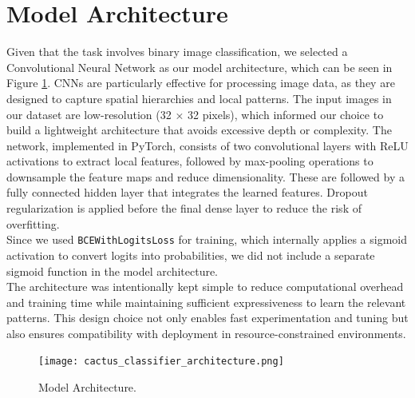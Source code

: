\documentclass[ngerman]{scrartcl}
\begin{document}
\section{Model Architecture}
Given that the task involves binary image classification, we selected a Convolutional Neural Network as our model architecture, which can be seen in Figure \ref{fig:model}. CNNs are particularly effective for processing image data, as they are designed to capture spatial hierarchies and local patterns. The input images in our dataset are low-resolution (32 × 32 pixels), which informed our choice to build a lightweight architecture that avoids excessive depth or complexity. The network, implemented in PyTorch, consists of two convolutional layers with ReLU activations to extract local features, followed by max-pooling operations to downsample the feature maps and reduce dimensionality. These are followed by a fully connected hidden layer that integrates the learned features.
Dropout regularization is applied before the final dense layer to reduce the risk of overfitting.\\ Since we used \texttt{BCEWithLogitsLoss} for training, which internally applies a sigmoid activation to convert logits into probabilities, we did not include a separate sigmoid function in the model architecture.\\ The architecture was intentionally kept simple to reduce computational overhead and training time while maintaining sufficient expressiveness to learn the relevant patterns. This design choice not only enables fast experimentation and tuning but also ensures compatibility with deployment in resource-constrained environments.
\begin{figure}[h]
    \centering
    \texttt{[image: cactus\_classifier\_architecture.png]}
    \caption{Model Architecture.}
    \label{fig:model}
\end{figure}
\end{document}
